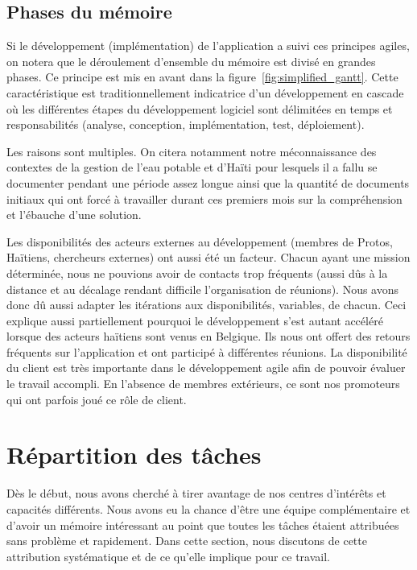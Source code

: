 \documentclass{EPL-master-thesis-covers-FR}
\begin{document}
			\subsection*{Phases du mémoire}

				Si le développement (implémentation) de l'application a suivi ces principes agiles, on notera que le déroulement d'ensemble du mémoire est divisé en grandes phases. Ce principe est mis en avant dans la figure~\ref{fig:simplified_gantt}. Cette caractéristique est traditionnellement indicatrice d'un développement en cascade où les différentes étapes du développement logiciel sont délimitées en temps et responsabilités (analyse, conception, implémentation, test, déploiement).

				Les raisons sont multiples. On citera notamment notre méconnaissance des contextes de la gestion de l'eau potable et d'Haïti pour lesquels il a fallu se documenter pendant une période assez longue ainsi que la quantité de documents initiaux qui ont forcé à travailler durant ces premiers mois sur la compréhension et l'ébauche d'une solution.

				Les disponibilités des acteurs externes au développement (membres de Protos, Haïtiens, chercheurs externes) ont aussi été un facteur. Chacun ayant une mission déterminée, nous ne pouvions avoir de contacts trop fréquents (aussi dûs à la distance et au décalage rendant difficile l'organisation de réunions). Nous avons donc dû aussi adapter les itérations aux disponibilités, variables, de chacun. Ceci explique aussi partiellement pourquoi le développement s'est autant accéléré lorsque des acteurs haïtiens sont venus en Belgique. Ils nous ont offert des retours fréquents sur l'application et ont participé à différentes réunions. La disponibilité du client est très importante dans le développement agile afin de pouvoir évaluer le travail accompli. En l'absence de membres extérieurs, ce sont nos promoteurs qui ont parfois joué ce rôle de client.

		\section{Répartition des tâches}

			Dès le début, nous avons cherché à tirer avantage de nos centres d'intérêts et capacités différents. Nous avons eu la chance d'être une équipe complémentaire et d'avoir un mémoire intéressant au point que toutes les tâches étaient attribuées sans problème et rapidement. Dans cette section, nous discutons de cette attribution systématique et de ce qu'elle implique pour ce travail.
\end{document}
